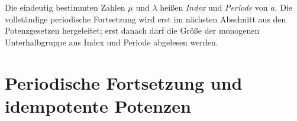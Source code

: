 \documentclass[main.tex]{subfiles}
\begin{document}
\begin{tabproofwide}
\end{tabproofwide}

Die eindeutig bestimmten Zahlen \(\mu\) und \(\lambda\) heißen
\emph{Index} und \emph{Periode} von \(a\).  Die vollständige periodische
Fortsetzung wird erst im nächsten Abschnitt aus den Potenzgesetzen
hergeleitet; erst danach darf die Größe der monogenen Unterhalbgruppe aus
Index und Periode abgelesen werden.

\section{Periodische Fortsetzung und idempotente Potenzen}
\end{document}
